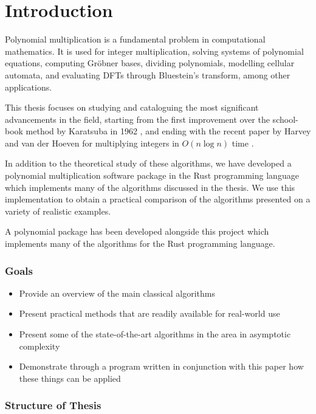 \chapter{Introduction}\label{introduction}


Polynomial multiplication is a fundamental problem in computational mathematics. It is used for integer multiplication, solving systems of polynomial equations, computing Gr\"{o}bner bases, dividing polynomials, modelling cellular automata, and evaluating DFTs through Bluestein's transform, among other applications.

This thesis focuses on studying and cataloguing the most significant advancements in the field, starting from the first improvement over the school-book method by Karatsuba in 1962 \cite{karatsuba}, and ending with the recent paper by Harvey and van der Hoeven for multiplying integers in $O(n\log n)$ time \cite{nlogn}. 

In addition to the theoretical study of these algorithms, we have developed a polynomial multiplication software package in the Rust programming language which implements many of the algorithms discussed in the thesis. We use this implementation to obtain a practical comparison of the algorithms presented on a variety of realistic examples.

A polynomial package has been developed alongside this project which implements many of the algorithms for the Rust programming language.

\subsection{Goals}%
\label{sub:goals}

\begin{itemize}
    \item Provide an overview of the main classical algorithms
    \item Present practical methods that are readily available for real-world use
    \item Present some of the state-of-the-art algorithms in the area in asymptotic complexity
    \item Demonstrate through a program written in conjunction with this paper how these things can be applied
\end{itemize}


\subsection{Structure of Thesis}
\label{sub:Structure-of-Thesis}

